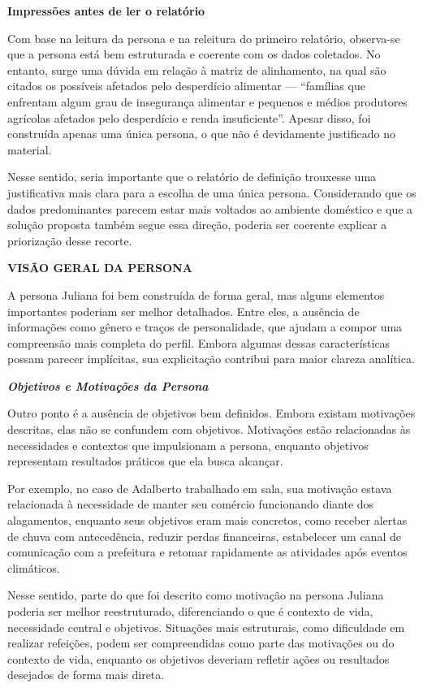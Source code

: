 \documentclass[
  sigconf,
  nonacm, %
  language=portuguese
]{acmart}
\begin{document}
\textbf{Impressões antes de ler o relatório}

Com base na leitura da persona e na releitura do primeiro relatório, observa-se que a persona está bem estruturada e coerente com os dados coletados. No entanto, surge uma dúvida em relação à matriz de alinhamento, na qual são citados os possíveis afetados pelo desperdício alimentar — “famílias que enfrentam algum grau de insegurança alimentar e pequenos e médios produtores agrícolas afetados pelo desperdício e renda insuficiente”. Apesar disso, foi construída apenas uma única persona, o que não é devidamente justificado no material.

Nesse sentido, seria importante que o relatório de definição trouxesse uma justificativa mais clara para a escolha de uma única persona. Considerando que os dados predominantes parecem estar mais voltados ao ambiente doméstico e que a solução proposta também segue essa direção, poderia ser coerente explicar a priorização desse recorte.

\textbf{VISÃO GERAL DA PERSONA}

A persona Juliana foi bem construída de forma geral, mas alguns elementos importantes poderiam ser melhor detalhados. Entre eles, a ausência de informações como gênero e traços de personalidade, que ajudam a compor uma compreensão mais completa do perfil. Embora algumas dessas características possam parecer implícitas, sua explicitação contribui para maior clareza analítica.

\textit{\textbf{Objetivos e Motivações da Persona}}

Outro ponto é a ausência de objetivos bem definidos. Embora existam motivações descritas, elas não se confundem com objetivos. Motivações estão relacionadas às necessidades e contextos que impulsionam a persona, enquanto objetivos representam resultados práticos que ela busca alcançar.

Por exemplo, no caso de Adalberto trabalhado em sala, sua motivação estava relacionada à necessidade de manter seu comércio funcionando diante dos alagamentos, enquanto seus objetivos eram mais concretos, como receber alertas de chuva com antecedência, reduzir perdas financeiras, estabelecer um canal de comunicação com a prefeitura e retomar rapidamente as atividades após eventos climáticos.

Nesse sentido, parte do que foi descrito como motivação na persona Juliana poderia ser melhor reestruturado, diferenciando o que é contexto de vida, necessidade central e objetivos. Situações mais estruturais, como dificuldade em realizar refeições, podem ser compreendidas como parte das motivações ou do contexto de vida, enquanto os objetivos deveriam refletir ações ou resultados desejados de forma mais direta.
\end{document}
